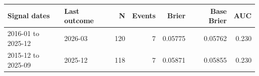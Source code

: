 \begin{tabular}{@{}llrrrrr@{}}\toprule
Signal dates & Last outcome & N & Events & Brier & Base Brier & AUC\\\midrule
2016-01 to 2025-12 & 2026-03 & 120 & 7 & 0.05775 & 0.05762 & 0.230\\
2015-12 to 2025-09 & 2025-12 & 118 & 7 & 0.05871 & 0.05855 & 0.230\\
\bottomrule
\end{tabular}
